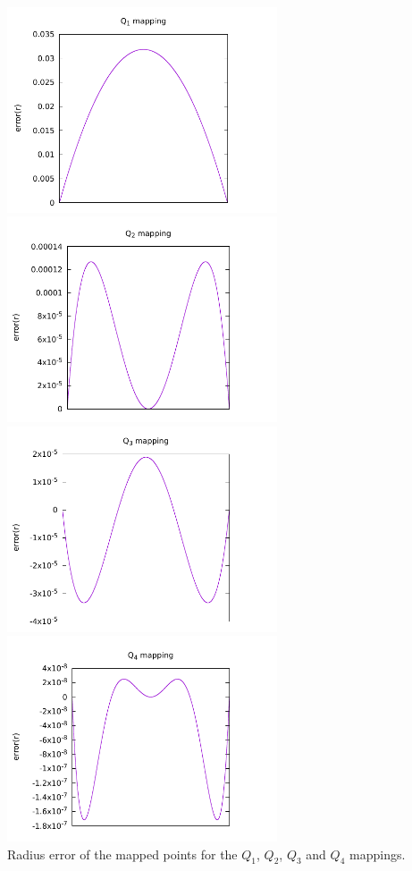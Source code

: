 \begin{center}
\includegraphics[width=8cm]{images/mappings/curved/innerline_error_Q1mapping.pdf}
\includegraphics[width=8cm]{images/mappings/curved/innerline_error_Q2mapping.pdf}\\
\includegraphics[width=8cm]{images/mappings/curved/innerline_error_Q3mapping.pdf}
\includegraphics[width=8cm]{images/mappings/curved/innerline_error_Q4mapping.pdf}\\
{\captionfont Radius error of the mapped points for the $Q_1$, $Q_2$, $Q_3$ and $Q_4$ mappings.}
\end{center}

